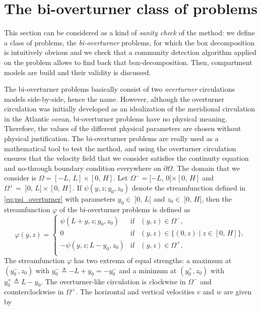 \section{The bi-overturner class of problems}
This section can be considered as a kind of \textit{sanity check} of the method: we define a class of problems, the \textit{bi-overturner} problems, for which the box decomposition is intuitively obvious and we check that a community detection algorithm applied on the problem allows to find back that box-decomposition. Then, compartment models are build and their validity is discussed. 

The bi-overturner problems basically consist of two \textit{overturner} circulations models side-by-side, hence the name. However, although the overturner circulation was initially developed as an idealization of the meridional circulation in the Atlantic ocean, bi-overturner problems have no physical meaning. Therefore, the values of the different physical parameters are chosen without physical justification. The bi-overturner problems are really used as a mathematical tool to test the method, and using the overturner circulation ensures that the velocity field that we consider satisfies the continuity equation and no-through boundary condition everywhere on $\partial \Omega$. The domain that we consider is $\Omega = [-L,\,L]\times[0,\,H]$. Let $\Omega^- = [-L,\,0[\times[0,\,H]$ and $\Omega^+ =\; ]0,\,L]\times[0,\,H]$. If $\psi(y,z;y_0,z_0)$ denote the streamfunction defined in \eqref{eq:psi_overturner} with parameters $y_0 \in\; ]0,\,L[$ and $z_0 \in\; ]0,\,H[$, then the streamfunction $\varphi$ of the bi-overturner problems is defined as
\begin{equation} \label{eq:psi_2box}
	\varphi(y,z) = \left\{ 
		\begin{array}{lrr}
			\psi(L+y,z;y_0,z_0) & \mbox{if} & (y,z) \in \Omega^-,\\
			0 & \mbox{if} & (y,z) \in \{(0,z)\;|\;z \in [0,\,H]\},\\
			-\psi(y,z;L-y_0,z_0) & \mbox{if} & (y,z) \in \Omega^+,\\
		\end{array}
	\right.
\end{equation}
The streamfunction $\varphi$ has two extrema of equal strengths: a maximum at $(y_0^-,z_0)$ with $y_0^- \triangleq -L+y_0 = -y_0^-$ and a minimum at $(y_0^+,z_0)$ with $y_0^+ \triangleq L-y_0$. The overturner-like circulation is clockwise in $\Omega^-$ and counterclockwise in $\Omega^+$. The horizontal and vertical velocities $v$ and $w$ are given by
